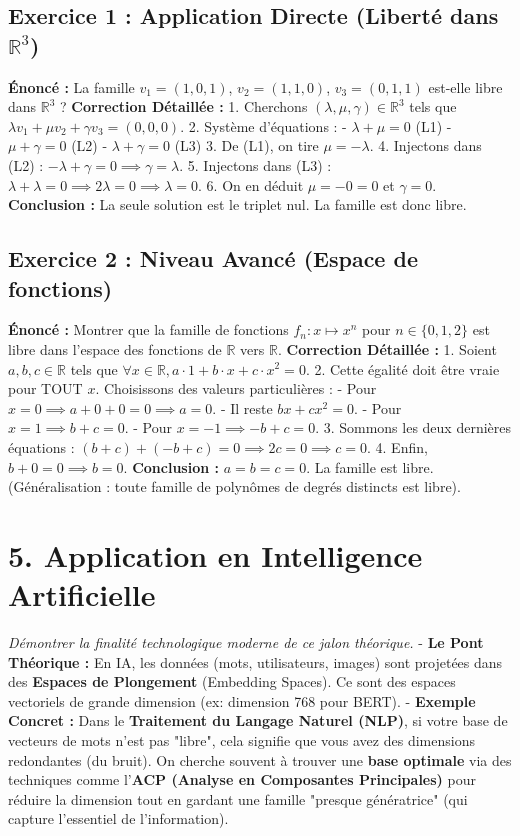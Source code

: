 \documentclass{report}
\begin{document}
\subsection*{Exercice 1 : Application Directe (Liberté dans $\mathbb{R}^3$)}
\textbf{Énoncé :} La famille $v_1 = (1, 0, 1)$, $v_2 = (1, 1, 0)$, $v_3 = (0, 1, 1)$ est-elle libre dans $\mathbb{R}^3$ ?
\textbf{Correction Détaillée :}
1. Cherchons $(\lambda, \mu, \gamma) \in \mathbb{R}^3$ tels que $\lambda v_1 + \mu v_2 + \gamma v_3 = (0, 0, 0)$.
2. Système d'équations :
   - $\lambda + \mu = 0$ (L1)
   - $\mu + \gamma = 0$ (L2)
   - $\lambda + \gamma = 0$ (L3)
3. De (L1), on tire $\mu = -\lambda$.
4. Injectons dans (L2) : $-\lambda + \gamma = 0 \implies \gamma = \lambda$.
5. Injectons dans (L3) : $\lambda + \lambda = 0 \implies 2\lambda = 0 \implies \lambda = 0$.
6. On en déduit $\mu = -0 = 0$ et $\gamma = 0$.
\textbf{Conclusion :} La seule solution est le triplet nul. La famille est donc libre.

\subsection*{Exercice 2 : Niveau Avancé (Espace de fonctions)}
\textbf{Énoncé :} Montrer que la famille de fonctions $f_n : x \mapsto x^n$ pour $n \in \{0, 1, 2\}$ est libre dans l'espace des fonctions de $\mathbb{R}$ vers $\mathbb{R}$.
\textbf{Correction Détaillée :}
1. Soient $a, b, c \in \mathbb{R}$ tels que $\forall x \in \mathbb{R}, a \cdot 1 + b \cdot x + c \cdot x^2 = 0$.
2. Cette égalité doit être vraie pour TOUT $x$. Choisissons des valeurs particulières :
   - Pour $x = 0 \implies a + 0 + 0 = 0 \implies a = 0$.
   - Il reste $bx + cx^2 = 0$.
   - Pour $x = 1 \implies b + c = 0$.
   - Pour $x = -1 \implies -b + c = 0$.
3. Sommons les deux dernières équations : $(b+c) + (-b+c) = 0 \implies 2c = 0 \implies c = 0$.
4. Enfin, $b + 0 = 0 \implies b = 0$.
\textbf{Conclusion :} $a=b=c=0$. La famille est libre. (Généralisation : toute famille de polynômes de degrés distincts est libre).

\section*{5. Application en Intelligence Artificielle}
\textit{Démontrer la finalité technologique moderne de ce jalon théorique.}
- \textbf{Le Pont Théorique :} En IA, les données (mots, utilisateurs, images) sont projetées dans des \textbf{Espaces de Plongement} (Embedding Spaces). Ce sont des espaces vectoriels de grande dimension (ex: dimension 768 pour BERT).
- \textbf{Exemple Concret :} Dans le \textbf{Traitement du Langage Naturel (NLP)}, si votre base de vecteurs de mots n'est pas "libre", cela signifie que vous avez des dimensions redondantes (du bruit). On cherche souvent à trouver une \textbf{base optimale} via des techniques comme l'\textbf{ACP (Analyse en Composantes Principales)} pour réduire la dimension tout en gardant une famille "presque génératrice" (qui capture l'essentiel de l'information).
\end{document}
